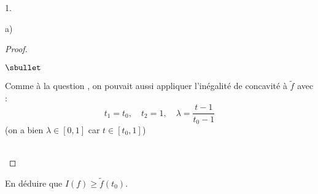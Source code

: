 \documentclass[11pt]{article}%
\begin{document}
\begin{noliste}{1.}
\begin{noliste}{a)}
\begin{proof}
\begin{noliste}{$\sbullet$}
     \end{noliste}
    
    
    
    
    \newpage
    
    
    
    
    \begin{remark}
      Comme à la question , on pouvait aussi appliquer 
      l'inégalité de concavité à $\tilde{f}$ avec :
      \[
        t_1 = t_0, \quad t_2 = 1, \quad \lambda = \dfrac{t-1}{t_0-1}
      \]
      (on a bien $\lambda \in [0,1]$ car $t\in [t_0,1]$)
    \end{remark}~\\[-1.4cm]
  \end{proof}
  
  \item En déduire que $I(f) \geq \tilde{f}(t_0)$. 
  

\end{noliste}
\end{noliste}
\end{document}
